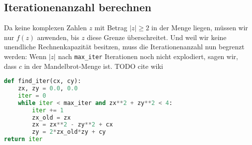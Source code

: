 \documentclass{article}
\begin{document}
\subsection{Iterationenanzahl berechnen}
Da keine komplexen Zahlen $z$ mit Betrag $|z| \geq 2$ in der Menge liegen, müssen wir nur $f(z)$ anwenden, bis $z$ diese Grenze überschreitet. Und weil wir keine unendliche Rechnenkapazität besitzen, muss die Iterationenanzahl nun begrenzt werden: Wenn $|z|$ nach \lstinline|max_iter| Iterationen noch nicht explodiert, sagen wir, dass $c$ in der Mandelbrot-Menge ist. TODO cite wiki
\begin{lstlisting}[language=Python]
def find_iter(cx, cy):
	zx, zy = 0.0, 0.0
	iter = 0
	while iter < max_iter and zx**2 + zy**2 < 4:
		iter += 1
		zx_old = zx
		zx = zx**2 - zy**2 + cx
		zy = 2*zx_old*zy + cy
return iter
\end{lstlisting}
\end{document}
